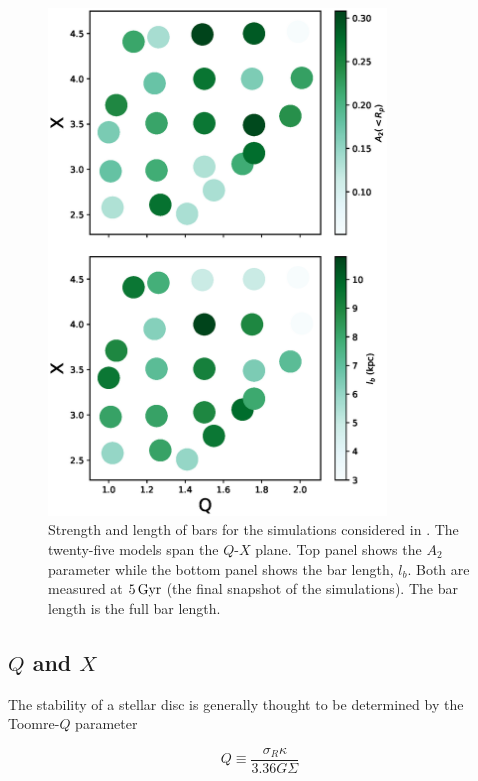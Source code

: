\begin{figure}
	\centering
	\includegraphics[width=0.8\textwidth]{../figures/wpd.eps}
	\caption{Strength and length of bars for the simulations
          considered in \citet{WPDGalactICSReference}.  The twenty-five models
          span the $Q$-$X$ plane.  Top panel shows the $A_2$ parameter
          while the bottom panel shows the bar length, $l_b$.  Both are
          measured at $5\,{\rm Gyr}$ (the final snapshot of the
          simulations). {The bar length is the full bar length.}}
	\label{fig:qxa2}
\end{figure}




\subsection{$Q$ and $X$} 
The stability of a stellar disc is generally thought to be determined
by the Toomre-$Q$ parameter \citep{ToomreParameter}

\begin{equation} \label{eq:q}
Q \equiv \frac{\sigma_R\kappa}{3.36G\Sigma}
\end{equation}

